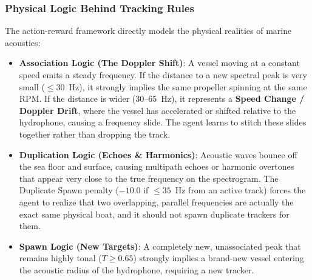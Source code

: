 \documentclass[12pt,a4paper]{article}
\begin{document}
\subsubsection{Physical Logic Behind Tracking Rules}
The action-reward framework directly models the physical realities of marine acoustics:
\begin{itemize}
    \item \textbf{Association Logic (The Doppler Shift)}: A vessel moving at a constant speed emits a steady frequency. If the distance to a new spectral peak is very small ($\le 30$~Hz), it strongly implies the same propeller spinning at the same RPM. If the distance is wider ($30$--$65$~Hz), it represents a \textbf{Speed Change / Doppler Drift}, where the vessel has accelerated or shifted relative to the hydrophone, causing a frequency slide. The agent learns to stitch these slides together rather than dropping the track.
    \item \textbf{Duplication Logic (Echoes \& Harmonics)}: Acoustic waves bounce off the sea floor and surface, causing multipath echoes or harmonic overtones that appear very close to the true frequency on the spectrogram. The Duplicate Spawn penalty ($-10.0$ if $\le 35$~Hz from an active track) forces the agent to realize that two overlapping, parallel frequencies are actually the exact same physical boat, and it should not spawn duplicate trackers for them.
    \item \textbf{Spawn Logic (New Targets)}: A completely new, unassociated peak that remains highly tonal ($T \ge 0.65$) strongly implies a brand-new vessel entering the acoustic radius of the hydrophone, requiring a new tracker.
\end{itemize}
\end{document}
